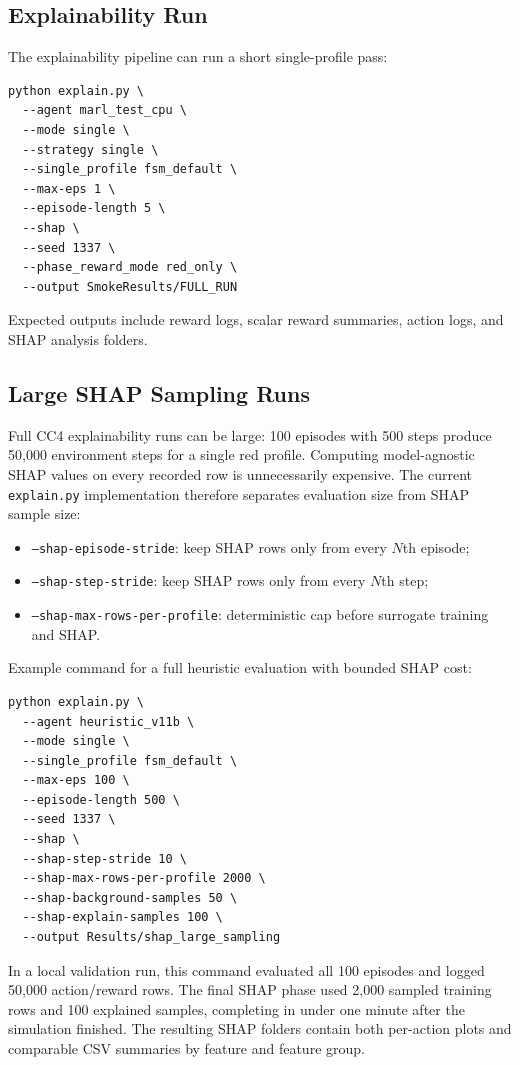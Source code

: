 \subsection{Explainability Run}

The explainability pipeline can run a short single-profile pass:

\begin{lstlisting}
python explain.py \
  --agent marl_test_cpu \
  --mode single \
  --strategy single \
  --single_profile fsm_default \
  --max-eps 1 \
  --episode-length 5 \
  --shap \
  --seed 1337 \
  --phase_reward_mode red_only \
  --output SmokeResults/FULL_RUN
\end{lstlisting}

Expected outputs include reward logs, scalar reward summaries, action logs, and SHAP analysis folders.

\subsection{Large SHAP Sampling Runs}

Full CC4 explainability runs can be large: 100 episodes with 500 steps produce
50,000 environment steps for a single red profile. Computing model-agnostic SHAP
values on every recorded row is unnecessarily expensive. The current
\texttt{explain.py} implementation therefore separates evaluation size from SHAP
sample size:

\begin{itemize}
  \item \texttt{--shap-episode-stride}: keep SHAP rows only from every $N$th episode;
  \item \texttt{--shap-step-stride}: keep SHAP rows only from every $N$th step;
  \item \texttt{--shap-max-rows-per-profile}: deterministic cap before surrogate training and SHAP.
\end{itemize}

Example command for a full heuristic evaluation with bounded SHAP cost:

\begin{lstlisting}
python explain.py \
  --agent heuristic_v11b \
  --mode single \
  --single_profile fsm_default \
  --max-eps 100 \
  --episode-length 500 \
  --seed 1337 \
  --shap \
  --shap-step-stride 10 \
  --shap-max-rows-per-profile 2000 \
  --shap-background-samples 50 \
  --shap-explain-samples 100 \
  --output Results/shap_large_sampling
\end{lstlisting}

In a local validation run, this command evaluated all 100 episodes and logged
50,000 action/reward rows. The final SHAP phase used 2,000 sampled training rows
and 100 explained samples, completing in under one minute after the simulation
finished. The resulting SHAP folders contain both per-action plots and comparable
CSV summaries by feature and feature group.
